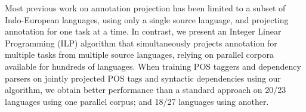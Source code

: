 Most previous work on annotation projection has been limited to a subset of Indo-European languages, using only a single source language, and projecting annotation for one task at a time. In contrast, we present an Integer Linear Programming (ILP) algorithm that simultaneously projects annotation for multiple tasks from multiple source languages, relying on parallel corpora available for hundreds of languages. When training POS taggers and dependency parsers on jointly projected POS tags and syntactic dependencies using our algorithm, we obtain better performance than a standard approach on 20/23 languages using one parallel corpus; and 18/27 languages using another.
